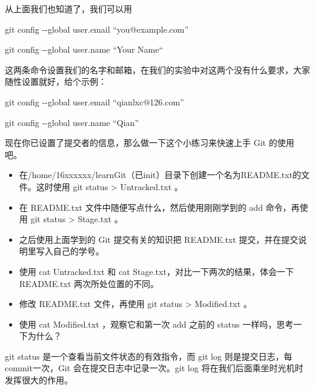 \begin{note}
从上面我们也知道了，我们可以用  

  git config -{}-global user.email “you@example.com”
  
  git config -{}-global user.name “Your Name“
  
这两条命令设置我们的名字和邮箱，在我们的实验中对这两个没有什么要求，大家随性设置就好，给个示例：

  git config -{}-global user.email “qianlxc@126.com”
  
  git config -{}-global user.name “Qian”
\end{note}

现在你已设置了提交者的信息，那么做一下这个小练习来快速上手 Git 的使用吧。

\begin{exercise}
\begin{itemize}
    \item 在/home/16xxxxxx/learnGit（已init）目录下创建一个名为README.txt的文件。这时使用 git status > Untracked.txt 。
	\item 在 README.txt 文件中随便写点什么，然后使用刚刚学到的 add 命令，再使用 git status > Stage.txt 。
	\item 之后使用上面学到的 Git 提交有关的知识把 README.txt 提交，并在提交说明里写入自己的学号。
	\item 使用 cat Untracked.txt 和 cat Stage.txt，对比一下两次的结果，体会一下README.txt 两次所处位置的不同。
	\item 修改 README.txt 文件，再使用 git status > Modified.txt 。
	\item 使用 cat Modified.txt ，观察它和第一次 add 之前的 status 一样吗，思考一 下为什么？
\end{itemize}
\end{exercise}

\begin{note}
git status 是一个查看当前文件状态的有效指令，而 git log 则是提交日志，每commit一次，Git 会在提交日志中记录一次。git log 将在我们后面乘坐时光机时发挥很大的作用。
\end{note}

